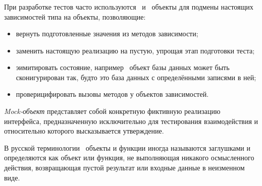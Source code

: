 \subsubsection{}
\label{sec:testing:unit:mock}

При разработке тестов часто используются \mock \, и \stub \, объекты для подмены настоящих зависимостей типа на объекты, позволяющие:

\begin{itemize}
	\item вернуть подготовленные значения из методов зависимости;
	\item заменить настоящую реализацию на пустую, упрощая этап подготовки теста;
	\item эимитировать состояние, например \stub \, объект базы данных может быть сконигурирован так, будто это база данных с определёнными записями в ней;
	\item проверицифировать вызовы методов у объектов зависимостей.
\end{itemize}

\textit{Mock-объект} представляет собой конкретную фиктивную реализацию интерфейса, предназначенную исключительно для тестирования взаимодействия и относительно которого высказывается утверждение. \cite{wiki:mock}

В русской терминологии \stub \, объекты и функции иногда называются заглушками и определяются как объект или функция, не выполняющая никакого осмысленного действия, возвращающая пустой результат или входные данные в неизменном виде. \cite{wiki:stub}
